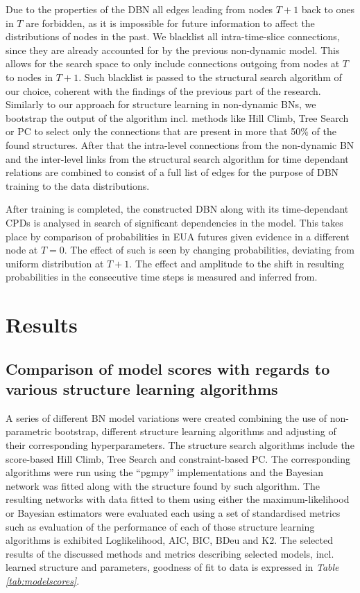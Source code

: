 \documentclass[12pt, letterpaper]{article}
\begin{document}
Due to the properties of the DBN all edges leading from nodes $T+1$ back to ones in $T$ are forbidden, as it is impossible for future information to affect the distributions of nodes in the past. We blacklist all intra-time-slice connections, since they are already accounted for by the previous non-dynamic model. This allows for the search space to only include connections outgoing from nodes at $T$ to nodes in $T+1$. Such blacklist is passed to the structural search algorithm of our choice, coherent with the findings of the previous part of the research. Similarly to our approach for structure learning in non-dynamic BNs, we bootstrap the output of the algorithm incl. methods like Hill Climb, Tree Search or PC to select only the connections that are present in more that 50\% of the found structures. After that the intra-level connections from the non-dynamic BN and the inter-level links from the structural search algorithm for time dependant relations are combined to consist of a full list of edges for the purpose of DBN training to the data distributions.

After training is completed, the constructed DBN along with its time-dependant CPDs is analysed in search of significant dependencies in the model. This takes place by comparison of probabilities in EUA futures given evidence in a different node at $T=0$. The effect of such is seen by changing probabilities, deviating from uniform distribution at $T+1$. The effect and amplitude to the shift in resulting probabilities in the consecutive time steps is measured and inferred from.

\pagestyle{fancy}
\section{Results}
\subsection{Comparison of model scores with regards to various structure learning algorithms}

A series of different BN model variations were created combining the use of non-parametric bootstrap, different structure learning algorithms and adjusting of their corresponding hyperparameters. The structure search algorithms include the score-based Hill Climb, Tree Search and constraint-based PC. The corresponding algorithms were run using the “pgmpy” implementations and the Bayesian network was fitted along with the structure found by such algorithm. The resulting networks with data fitted to them using either the maximum-likelihood or Bayesian estimators were evaluated each using a set of standardised metrics such as evaluation of the performance of each of those structure learning algorithms is exhibited Loglikelihood, AIC, BIC, BDeu and K2. The selected results of the discussed methods and metrics describing selected models, incl. learned structure and parameters, goodness of fit to data is expressed in \textit{Table \ref{tab:modelscores}}.
\end{document}
